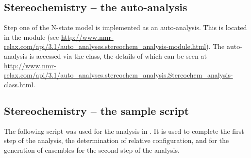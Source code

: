 
\subsection{Stereochemistry -- the auto-analysis}


Step one of the N-state model is implemented as an auto-analysis.
This is located in the module  (see \url{http://www.nmr-relax.com/api/3.1/auto_analyses.stereochem_analysis-module.html}).
The auto-analysis is accessed via the  class, the details of which can be seen at \url{http://www.nmr-relax.com/api/3.1/auto_analyses.stereochem_analysis.Stereochem_analysis-class.html}.



\subsection{Stereochemistry -- the sample script}

The following script was used for the analysis in \citet{Sun11}.
It is used to complete the first step of the analysis, the determination of relative configuration, and for the generation of ensembles for the second step of the analysis.


